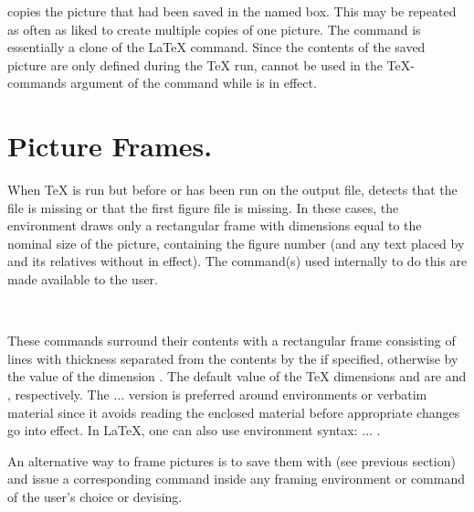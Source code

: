 \documentclass[letterpaper]{article}
\begin{document}
 copies the picture that had been saved in the named box.
This may be repeated as often as liked to create multiple copies of one
picture. The  command is essentially a clone of the \LaTeX{}
 command. Since the contents of the saved picture are only
defined during the \TeX{} run,  cannot be used in the
\TeX-commands argument of the  command while 
is in effect.


\section{Picture Frames.}\label{frames}

When \TeX{} is run but before \MF{} or \MP{} has been run on the output
file, \mfp{} detects that the  file is missing or that
the first \MP{} figure file  is missing. In these
cases, the  environment draws only a rectangular frame with
dimensions equal to the nominal size of the picture, containing the
figure number (and any text placed by  and its relatives
without  in effect). The command(s) used internally to do
this are made available to the user.

\begin{cd}
%
\\
%
%
%
\end{cd}

These commands surround their contents with a rectangular frame
consisting of lines with thickness  separated from
the contents by the  if specified, otherwise by the value of
the dimension . The default value of the \TeX{}
dimensions  and  are \dim{2pt} and
\dim{0.4pt}, respectively. The  $\ldots$ 
version is preferred around  environments or verbatim
material since it avoids reading the enclosed material before
appropriate  changes go into effect. In \LaTeX{}, one can
also use environment syntax:  $\ldots$
.

An alternative way to frame  pictures is to save them with
 (see previous section) and issue a corresponding
 command inside any framing environment or command of the user's
choice or devising.
\end{document}

